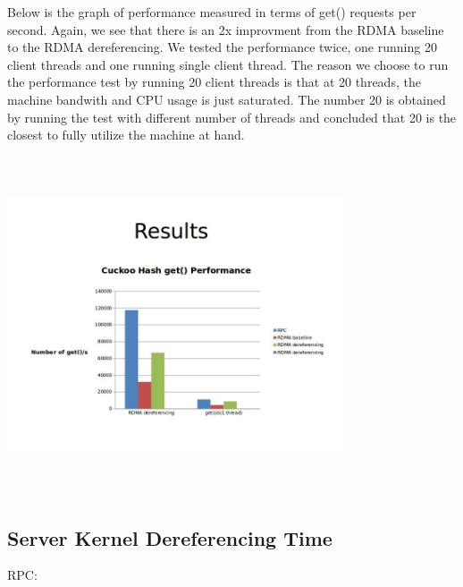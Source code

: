 \documentclass[a4paper, oneside, 10pt]{article}
\begin{document}
Below is the graph of performance measured in terms of get() requests per
second. Again, we see that there is an 2x improvment from the RDMA baseline to
the RDMA dereferencing. We tested the performance twice, one running 20 client
threads and one running single client thread. The reason we choose to run the
performance test by running 20 client threads is that at 20 threads, the machine
bandwith and CPU usage is just saturated. The number 20 is obtained by running
the test with different number of threads and concluded that 20 is the closest
to fully utilize the machine at hand.

\includegraphics[width=10cm,height=10cm,keepaspectratio]{performance.jpg}
\subsection{Server Kernel Dereferencing Time}

RPC:\\
\end{document}
